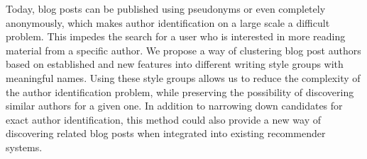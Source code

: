 
Today, blog posts can be published using pseudonyms or even completely anonymously, which makes author identification on a large scale a difficult problem. %
This impedes the search for a user who is interested in more reading material from a specific author. %
We propose a way of clustering blog post authors based on established and new features into different writing style groups with meaningful names.
Using these style groups allows us to reduce the complexity of the author identification problem, while preserving the possibility of discovering similar authors for a given one. %
In addition to narrowing down candidates for exact author identification, this method could also provide a new way of discovering related blog posts when integrated into existing recommender systems. %


